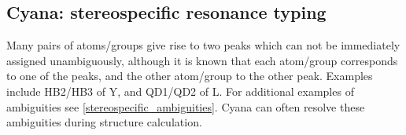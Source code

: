 \subsection*{Cyana: stereospecific resonance typing}
Many pairs of atoms/groups give rise to two peaks which can not be immediately
assigned unambiguously, although it is known that each atom/group corresponds 
to one of the peaks, and the other atom/group to the other peak.
Examples include HB2/HB3 of Y, and QD1/QD2 of L.
For additional examples of ambiguities see \ref{stereospecific_ambiguities}.
Cyana can often resolve these ambiguities during structure calculation.



